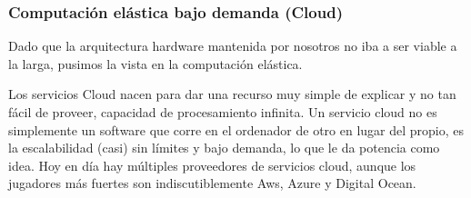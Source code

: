 \subsubsection{Computación elástica bajo demanda (Cloud)}
Dado que la arquitectura hardware mantenida por nosotros no iba a ser viable a la larga, pusimos la vista en la computación elástica.
\vspace{1em}
\par Los servicios Cloud nacen para dar una recurso muy simple de explicar y no tan fácil de proveer, capacidad de procesamiento infinita. Un servicio cloud no es simplemente un software que corre en el ordenador de otro en lugar del propio, es la escalabilidad (casi) sin límites y bajo demanda, lo que le da potencia como idea. Hoy en día hay múltiples proveedores de servicios cloud, aunque los jugadores más fuertes son indiscutiblemente Aws, Azure y Digital Ocean.
